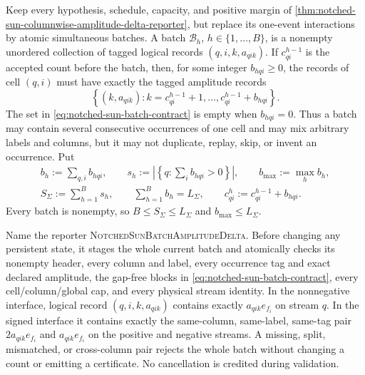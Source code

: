 \begin{theorem}
\label{thm:notched-sun-batched-columnwise-amplitude-delta-reporter}
Keep every hypothesis, schedule, capacity, and positive margin of
\cref{thm:notched-sun-columnwise-amplitude-delta-reporter}, but replace its
one-event interactions by atomic simultaneous batches.  A batch
$\mathcal B_h$, $h\in\{1,\ldots,B\}$, is a nonempty unordered collection of
tagged logical records $(q,i,k,a_{qik})$.  If $c_{qi}^{h-1}$ is the accepted
count before the batch, then, for some integer $b_{hqi}\geq0$, the records of
cell $(q,i)$ must have exactly the tagged amplitude records
\begin{equation}
 \left\{(k,a_{qik}):
 k=c_{qi}^{h-1}+1,\ldots,c_{qi}^{h-1}+b_{hqi}\right\}.
 \label{eq:notched-sun-batch-contract}
\end{equation}
The set in \cref{eq:notched-sun-batch-contract} is empty when $b_{hqi}=0$.
Thus a batch may contain several consecutive occurrences of one cell and may
mix arbitrary labels and columns, but it may not duplicate, replay, skip, or
invent an occurrence.  Put
\begin{equation}
 \begin{gathered}
  b_h:=\sum_{q,i}b_{hqi},
  \qquad
  s_h:=\left|\left\{q:\sum_i b_{hqi}>0\right\}\right|,
  \qquad
  b_{\max}:=\max_h b_h,\\
  S_\Sigma:=\sum_{h=1}^{B}s_h,
  \qquad
  \sum_{h=1}^{B}b_h=L_\Sigma,
  \qquad
  c_{qi}^{h}:=c_{qi}^{h-1}+b_{hqi}.
 \end{gathered}
 \label{eq:notched-sun-batch-counts}
\end{equation}
Every batch is nonempty, so $B\leq S_\Sigma\leq L_\Sigma$ and
$b_{\max}\leq L_\Sigma$.

Name the reporter \textsc{NotchedSunBatchAmplitudeDelta}.  Before changing
any persistent state, it stages the whole current batch and atomically checks
its nonempty header, every column and label, every occurrence tag and exact
declared amplitude, the gap-free blocks in
\cref{eq:notched-sun-batch-contract}, every cell/column/global cap, and every
physical stream identity.  In the nonnegative interface, logical record
$(q,i,k,a_{qik})$ contains exactly $a_{qik}e_{f_i}$ on stream $q$.  In the
signed interface it contains exactly the same-column, same-label, same-tag
pair $2a_{qik}e_{f_i}$ and $a_{qik}e_{f_i}$ on the positive and negative
streams.  A missing, split, mismatched, or cross-column pair rejects the whole
batch without changing a count or emitting a certificate.  No cancellation
is credited during validation.


\end{theorem}
